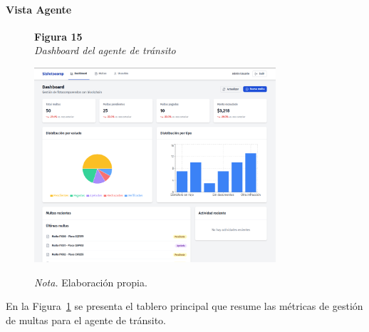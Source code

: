 \paragraph{Vista Agente}
\begin{figure}[htbp]
    \begin{flushleft}
        \textbf{Figura 15}\\[2em]
        \textit{Dashboard del agente de tránsito}
    \end{flushleft}
    \vspace{1em}
    \centering
    \includegraphics[width=0.8\textwidth]{Images/UI3.png}
    \vspace{2em}
    \begin{flushleft}
        \textit{Nota.} Elaboración propia.
    \end{flushleft}
    \label{fig:dashboard_agente}
\end{figure}
En la Figura~\ref{fig:dashboard_agente} se presenta el tablero principal que resume las métricas de gestión de multas para el agente de tránsito.
